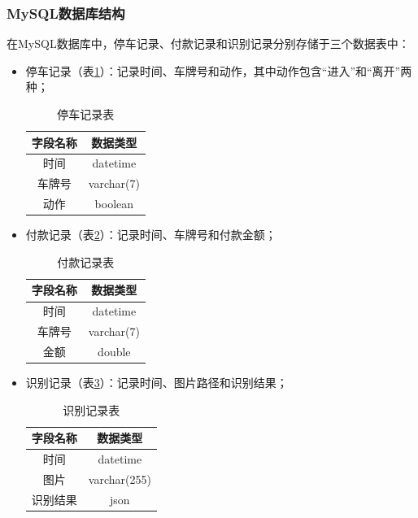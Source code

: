 \documentclass[a4paper]{ctexart}
\begin{document}
\subsubsection{MySQL数据库结构}
在MySQL数据库中，停车记录、付款记录和识别记录分别存储于三个数据表中：
\begin{itemize}
	\item 停车记录（表\ref{tab:停车记录表}）：记录时间、车牌号和动作，其中动作包含“进入”和“离开”两种；
	      \begin{table}[htbp]
		      \centering
		      \caption{停车记录表}
		      \begin{tabular}{|c|c|}
			      \hline
			      字段名称 & 数据类型   \\
			      \hline
			      时间     & datetime   \\
			      \hline
			      车牌号   & varchar(7) \\
			      \hline
			      动作     & boolean    \\
			      \hline
		      \end{tabular}
		      \label{tab:停车记录表}
	      \end{table}
	\item 付款记录（表\ref{tab:付款记录表}）：记录时间、车牌号和付款金额；
	      \begin{table}[htbp]
		      \centering
		      \caption{付款记录表}
		      \begin{tabular}{|c|c|}
			      \hline
			      字段名称 & 数据类型   \\
			      \hline
			      时间     & datetime   \\
			      \hline
			      车牌号   & varchar(7) \\
			      \hline
			      金额     & double     \\
			      \hline
		      \end{tabular}
		      \label{tab:付款记录表}
	      \end{table}
	\item 识别记录（表\ref{tab:识别记录表}）：记录时间、图片路径和识别结果；
	      \begin{table}[htbp]
		      \centering
		      \caption{识别记录表}
		      \begin{tabular}{|c|c|}
			      \hline
			      字段名称 & 数据类型     \\
			      \hline
			      时间     & datetime     \\
			      \hline
			      图片     & varchar(255) \\
			      \hline
			      识别结果 & json         \\
			      \hline
		      \end{tabular}
		      \label{tab:识别记录表}
	      \end{table}
\end{itemize}
\end{document}
